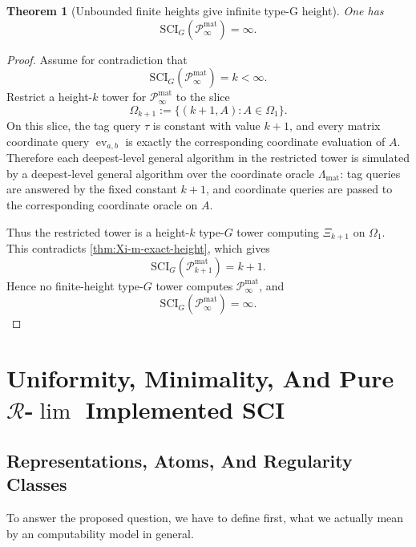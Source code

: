 \documentclass{lmcs} %
\theoremstyle{plain}
\theoremstyle{plain}
\newtheorem{theorem}{Theorem}[section]
\theoremstyle{definition}
\theoremstyle{remark}
\theoremstyle{definition}
\theoremstyle{remark}
\numberwithin{equation}{section}
\newcommand{\Lim}{\operatorname{lim}}
\newcommand{\SCIG}{\mathrm{SCI}_G}
\begin{document}
\begin{theorem}[Unbounded finite heights give infinite type-G height]\label{thm:Xi-infty-height}
One has
\[
\mathrm{SCI}_G(\mathcal P_\infty^{\mathrm{mat}})=\infty.
\]
\end{theorem}

\begin{proof}
Assume for contradiction that
\[
        \SCIG(\mathcal P_\infty^{\mathrm{mat}})=k<\infty.
\]
Restrict a height-\(k\) tower for \(\mathcal P_\infty^{\mathrm{mat}}\) to the slice
\[
        \Omega_{k+1}:=\{(k+1,A) : A\in\Omega_1\}.
\]
On this slice, the tag query \(\tau\) is constant with value \(k+1\), and every matrix
coordinate query \(\operatorname{ev}_{a,b}\) is exactly the corresponding coordinate
evaluation of \(A\). Therefore each deepest-level general algorithm in the restricted
tower is simulated by a deepest-level general algorithm over the coordinate oracle
\(\Lambda_{\mathrm{mat}}\): tag queries are answered by the fixed constant \(k+1\), and
coordinate queries are passed to the corresponding coordinate oracle on \(A\).

Thus the restricted tower is a height-\(k\) type-\(G\) tower computing \(\Xi_{k+1}\) on
\(\Omega_1\). This contradicts \cref{thm:Xi-m-exact-height}, which gives
\[
        \SCIG(\mathcal P_{k+1}^{\mathrm{mat}})=k+1.
\]
Hence no finite-height type-\(G\) tower computes \(\mathcal P_\infty^{\mathrm{mat}}\), and
\[
        \SCIG(\mathcal P_\infty^{\mathrm{mat}})=\infty.
\]
\end{proof}

\section{Uniformity, Minimality, And Pure \texorpdfstring{\(\mathcal R\)-\(\Lim\)}{R-Lim} Implemented SCI}\label{sec:uniformity-minimality}

\subsection{Representations, Atoms, And Regularity Classes}\label{sec:representations-atoms-regularity}
To answer the proposed question, we have to define first, what we actually mean by an computability model in general.
\end{document}

